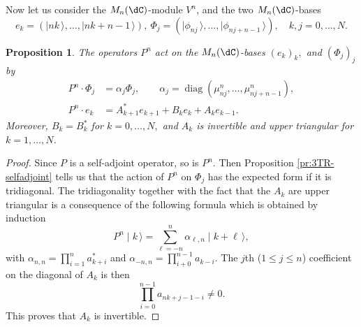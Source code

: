 \documentclass[a4paper,reqno]{amsart}
\DeclareMathOperator{\diag}{diag}
\newtheorem{proposition}[theorem]{Proposition}
\theoremstyle{definition}
\numberwithin{equation}{section}
\newcommand{\ket}[1]{\mid{#1}\,\rangle}
\begin{document}
Now let us consider the $M_n(\dC)$-module $V^n$, and the two $M_n(\dC)$-bases 
\begin{equation}
e_k=(\ket{nk},\ldots,\ket{nk+n-1}),\ \Phi_j=(\ket{\phi_{nj}},\ldots,\ket{\phi_{nj+n-1}}), \quad k,j=0,\ldots,N.
\end{equation}

\begin{proposition}
\label{prop:action-Pn-basis}
The operators $P^n$ act on the $M_n(\dC)$-bases $(e_k)_k,$ and $(\Phi_j)_j$ by 
\begin{align}
P^n\cdot \Phi_j &= \alpha_j \Phi_j, \qquad \alpha_j=\diag(\mu_{nj}^n, \ldots, \mu_{nj+n-1}^n ), \label{eq:alpha-P}\\
 P^n\cdot e_k&=A_{k+1}^\ast e_{k+1} + B_k e_k +A_k e_{k-1}. 
\end{align}
Moreover, $B_k=B_k^\ast$ for $k=0,\ldots, N,$ and $A_k$ is invertible and upper triangular for $k=1,\ldots,N$.  
\end{proposition}
\begin{proof}
    Since $P$ is a self-adjoint operator, so is $P^n$. Then Proposition \ref{pr:3TR-selfadjoint} tells us that the action of $P^n$ on $\Phi_j$ has the expected form if it is tridiagonal. The tridiagonality together with the fact that the $A_k$ are upper triangular is a consequence of the following formula which is obtained by induction
    \begin{equation}
    P^{n}\ket{k}=\sum_{\ell=-n}^{n}\alpha_{\ell,n}\ket{k+\ell},
    \end{equation}
    with  $\alpha_{n,n}=\prod_{i=1}^n a_{k+i}^*$ and $\alpha_{-n,n}=\prod_{i+0}^{n-1}a_{k-i}$. 
    The $j$th ($1\leq j\leq n$) coefficient on the diagonal of $A_k$ is then 
    \begin{equation}
    \prod_{i=0}^{n-1} a_{nk+j-1-i}\neq 0.
    \end{equation}
    This proves that $A_k$ is invertible. 
\end{proof}
\end{document}
